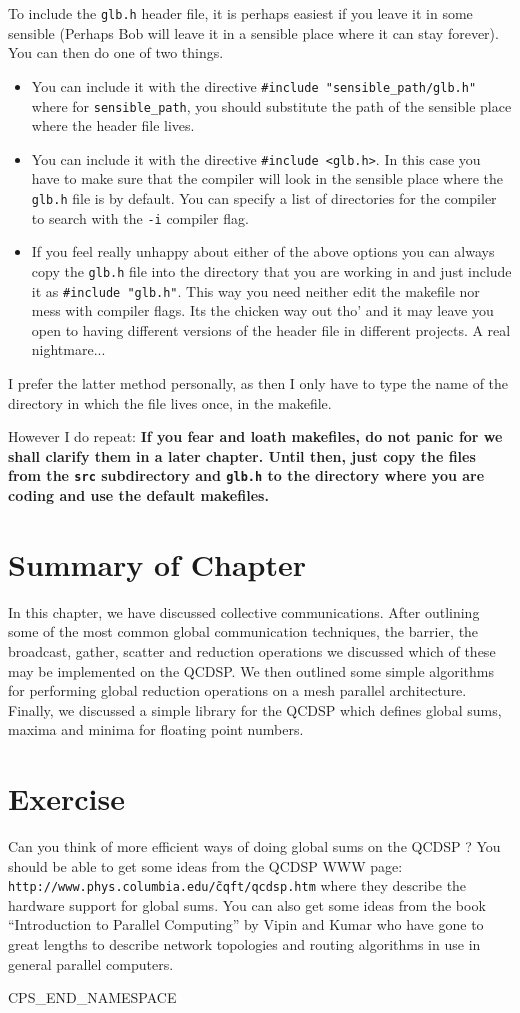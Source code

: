 To include the {\tt glb.h} header file, it is perhaps easiest 
if you leave it in some sensible (Perhaps Bob will leave it
in a sensible place where it can stay forever). You can then do 
one of two things.
\begin{itemize}
\item
You can include it with the directive {\tt \#include "sensible\_path/glb.h"}
where for {\tt sensible\_path}, you should substitute the path
of the sensible place where the header file lives.
\item
You can include it with the directive {\tt \#include <glb.h>}. In this
case you have to make sure that the compiler will look in the sensible
place where the {\tt glb.h} file is by default. You can specify
a list of directories for the compiler to search with the {\tt -i}
compiler flag.
\item
If you feel really unhappy about either of the above options you can
always copy the {\tt glb.h} file into the directory that you are working
in and just include it as {\tt \#include "glb.h"}. This way you need
neither edit the makefile nor mess with compiler flags. Its the 
chicken way out tho' and it may leave you open to having
different versions of the header file in different projects. A real
nightmare...
\end{itemize}
I prefer the latter method personally, as then I only have to 
type the name of the directory in which the file lives once, in
the makefile.

However I do repeat: {\bf If you fear and loath makefiles, do not
panic for we shall clarify them in a later chapter. Until then, just
copy the files from the {\tt src} subdirectory and {\tt glb.h} to the
directory where you are coding and use the default makefiles.}

\section{Summary of Chapter}
In this chapter, we have discussed collective communications.
After outlining some of the most common global communication techniques,
the barrier, the broadcast, gather, scatter and reduction operations
we discussed which of these may be implemented on the QCDSP. 
We then outlined some simple algorithms for performing global reduction
operations on a mesh parallel architecture. Finally, we discussed a
simple library for the QCDSP which defines global sums, maxima and minima
for floating point numbers.

\section{Exercise}
Can you think of more efficient ways of doing global sums on the 
QCDSP ? You should be able to get some ideas from the QCDSP WWW page:
{\tt http://www.phys.columbia.edu/\~cqft/qcdsp.htm} where they describe
the hardware support for global sums. You can also get some ideas
from the book ``Introduction to Parallel Computing'' by Vipin and Kumar
who have gone to great lengths to describe network topologies and 
routing algorithms in use in general parallel computers.


CPS_END_NAMESPACE
